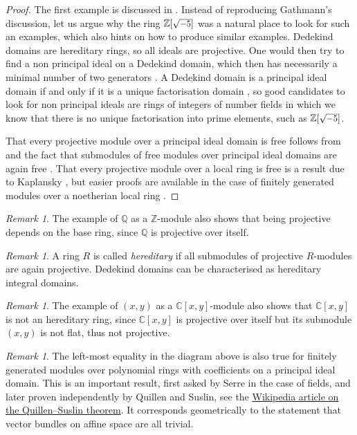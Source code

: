 \documentclass[A4paper, 12pt, british, reqno]{amsart}
\newcommand{\C}{\mathbb{C}} %
\newcommand{\Q}{\mathbb{Q}} %
\newcommand{\Z}{\mathbb{Z}} %
\theoremstyle{plain}
\theoremstyle{definition}
\theoremstyle{remark}
\newtheorem{rem}[thm]{Remark}
\theoremstyle{plain}
\theoremstyle{definition}
\theoremstyle{remark}
\theoremstyle{plain}
\theoremstyle{definition}
\theoremstyle{remark}
\begin{document}
{\color{gray}
\begin{proof}
    The first example is discussed in \cite[Example 13.8]{gat14}.
    Instead of reproducing Gathmann's discussion, let us argue why the ring $\Z[\scalebox{.9}{$\sqrt{-5}$}]$ was a natural place to look for such an examples, which also hints on how to produce similar examples.
    Dedekind domains are hereditary rings, so all ideals are projective.
    One would then try to find a non principal ideal on a Dedekind domain, which then has necessarily a minimal number of two generators \cite[Exercise I.3.6]{neu99}.
    A Dedekind domain is a principal ideal domain if and only if it is a unique factorisation domain \cite[Proposition 13.27]{gat14}, so good candidates to look for non principal ideals are rings of integers of number fields in which we know that there is no unique factorisation into prime elements, such as $\Z[\scalebox{.9}{$\sqrt{-5}$}]$.

    That every projective module over a principal ideal domain is free follows from  and the fact that submodules of free modules over principal ideal domains are again free \cite[Theorem 9.8]{rot02}.
    That every projective module over a local ring is free is a result due to Kaplansky \cite[Corollary 26.7]{af92}, but easier proofs are available in the case of finitely generated modules over a noetherian local ring \cite[Proposition 1.3.1]{fra18}.
\end{proof}
}

\begin{rem}
    The example of $\Q$ as a $\Z$-module also shows that being projective depends on the base ring, since $\Q$ is projective over itself.
\end{rem}

\begin{rem}
    A ring $R$ is called \textit{hereditary} if all submodules of projective $R$-modules are again projective.
    Dedekind domains can be characterised as hereditary integral domains.
\end{rem}

\begin{rem}
    The example of $(x,y)$ as a $\C[x,y]$-module also shows that $\C[x,y]$ is not an hereditary ring, since $\C[x,y]$ is projective over itself but its submodule $(x,y)$ is not flat, thus not projective.
\end{rem}

\begin{rem}
    The left-most equality in the diagram above is also true for finitely generated modules over polynomial rings with coefficients on a principal ideal domain.
    This is an important result, first asked by Serre in the case of fields, and later proven independently by Quillen and Suslin, see the \href{https://en.wikipedia.org/wiki/Quillen-Suslin_theorem}{Wikipedia article on the Quillen--Suslin theorem}.
    It corresponds geometrically to the statement that vector bundles on affine space are all trivial.
\end{rem}
\end{document}
